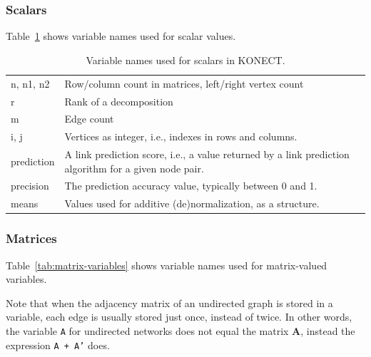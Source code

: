 \documentclass{article}
\begin{document}
\subsubsection{Scalars}
Table~\ref{tab:scalar-variables} shows variable names used for scalar
values.

\begin{table}
  \caption{ Variable names used for scalars in KONECT.
    \label{tab:scalar-variables}
  } \centering
  \begin{tabular}{>{\ttfamily}lp{}}
    \toprule n, n1, n2 & Row/column count in matrices, left/right vertex
    count \\ r & Rank of a decomposition \\ m & Edge count \\ i, j &
    Vertices as integer, i.e., indexes in rows and
    columns. \\ prediction & A link prediction score, i.e., a value
    returned by a link prediction algorithm for a given node
    pair. \\ precision & The prediction accuracy value, typically
    between 0 and 1.  \\ means & Values used for additive
    (de)normalization, as a structure. \\ \bottomrule
  \end{tabular}
\end{table}

\subsubsection{Matrices}
Table~\ref{tab:matrix-variables} shows variable names used for
matrix-valued variables.

Note that when the adjacency matrix of an undirected graph is stored in
a variable, each edge is usually stored just once, instead of twice. In
other words, the variable \texttt{A} for undirected networks does not
equal the matrix $\mathbf A$, instead the expression \texttt{A + A'}
does.
\end{document}
